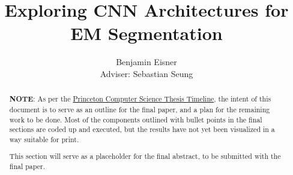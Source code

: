 \documentclass[pageno]{sty/jpaper}
\begin{document}
\title{
Exploring CNN Architectures for EM Segmentation}

\author{Benjamin Eisner\\Adviser: Sebastian Seung}

\date{}
\maketitle

\thispagestyle{empty}
\begin{abstract}
\textbf{NOTE}: As per the \href{https://www.cs.princeton.edu/ugrad/independent-work/important-steps-and-deadlines#Draft_Paper}{Princeton Computer Science Thesis Timeline}, the intent of this document is to serve as an outline for the final paper, and a plan for the remaining work to be done. Most of the components outlined with bullet points in the final sections are coded up and executed, but the results have not yet been visualized in a way suitable for print.

This section will serve as a placeholder for the final abstract, to be submitted with the final paper. 
\end{abstract}

\pagebreak

\tableofcontents

\pagebreak













\end{document}
